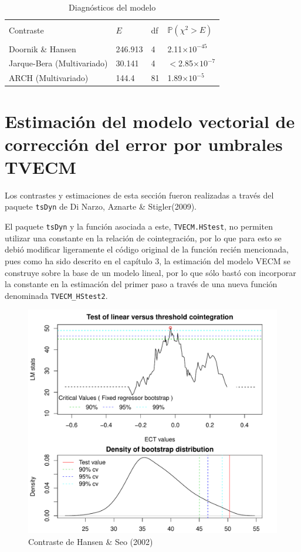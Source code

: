 \begin{table}[!htpb]
\centering
\caption{Diagnósticos del modelo}
\begin{tabular}{@{}llll@{}}
\toprule \\ 
Contraste   & $E$ & df & $\mathbb{P}(\chi^{2}>E)$ \\
\midrule \\ 
Doornik \& Hansen & 246.913 & 4 & 2.11$\times 10^{-45}$ \\
Jarque-Bera (Multivariado) & 30.141 & 4 & $<$2.85$\times 10^{-7}$ \\
ARCH (Multivariado) & 144.4 & 81 & 1.89$\times 10^{-5}$ \\ 
\bottomrule 
\end{tabular}
\end{table}

\section{Estimación del modelo vectorial de corrección del error por umbrales \textbf{TVECM}}
Los contrastes y estimaciones de esta sección fueron realizadas a través del paquete \texttt{tsDyn} de Di Narzo, Aznarte \& Stigler(2009).

El paquete \texttt{tsDyn} y la función asociada a este, \texttt{TVECM.HStest}, no permiten utilizar una constante en la relación de cointegración, por lo que para esto se debió modificar ligeramente el código original de la función recién mencionada, pues como ha sido descrito en el capítulo 3, la estimación del modelo VECM se construye sobre la base de un modelo lineal, por lo que sólo bastó con incorporar la constante en la estimación del primer paso a través de una nueva función denominada \texttt{TVECM\_HStest2}. 

\begin{figure}[H]
\centering
\caption{Contraste de Hansen \& Seo (2002)}
\includegraphics[scale=0.7]{fig_results/fig6.pdf}
\end{figure}

